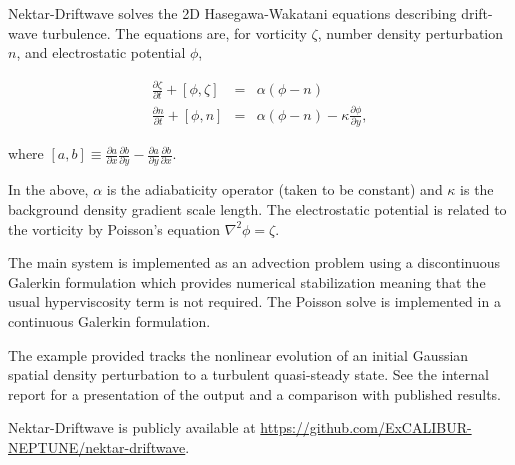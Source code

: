 Nektar-Driftwave solves the 2D Hasegawa-Wakatani equations describing drift-wave turbulence.  The equations are, for
vorticity $\zeta$, number density perturbation $n$, and electrostatic potential $\phi$,

\begin{eqnarray}
\frac{\partial \zeta}{\partial t}+[\phi, \zeta] &=& \alpha (\phi-n)\\
\frac{\partial n}{\partial t} +[\phi,n] &=& \alpha (\phi-n)-\kappa \frac{\partial \phi}{\partial y},
\end{eqnarray}

where $[a,b] \equiv \frac{\partial a}{\partial x} \frac{\partial b}{\partial y} - \frac{\partial a}{\partial y}
 \frac{\partial b}{\partial x}$.

In the above, $\alpha$ is the adiabaticity operator (taken to be constant) and $\kappa$ is the background density 
gradient scale length.  The electrostatic potential is related to the vorticity by Poisson's equation $\nabla^2 \phi 
= \zeta$.

The main system is implemented as an advection problem using a discontinuous Galerkin formulation which provides numerical
stabilization meaning that the usual hyperviscosity term is not required.  The Poisson solve is implemented in a 
continuous Galerkin formulation. 

The example provided tracks the nonlinear evolution of an initial Gaussian spatial density perturbation to a
 turbulent quasi-steady state.  See the internal report \cite{y3re222} for a presentation of the output and a 
comparison with published results.

Nektar-Driftwave is publicly available at \url{https://github.com/ExCALIBUR-NEPTUNE/nektar-driftwave}.  
